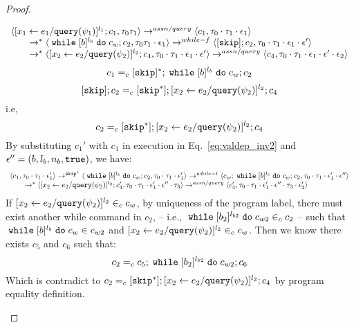 {\begin{proof}
\begin{subproof}
\[\begin{array}{l}
  \langle [\mathrel{ {x}_1 \leftarrow e_1 / {\tt query}(\psi_1) }]^{l_1} ; {c}_1, \mathtt{\tau}_0 \mathtt{\tau}_1 \rangle  
  \rightarrow^{assn/query}
  \langle c_1, \mathtt{\tau}_0 \cdot \mathtt{\tau}_1 \cdot \mathtt{\epsilon}_1 \rangle 
  \\
  \qquad \rightarrow^{*} 
  \langle \;\mathtt{while}\; [b]^{l_b} \;\mathtt{do}\; c_w;{c}_2, 
  \mathtt{\tau}_0 \mathtt{\tau}_1 \cdot \mathtt{\epsilon}_1 \rangle 
  \rightarrow^{while-f} 
  \langle [\mathtt{skip}]; c_2, \mathtt{\tau}_0 \cdot \mathtt{\tau}_1 \cdot \mathtt{\epsilon}_1 \cdot \mathtt{\epsilon}' \rangle 
  \\
  \qquad \rightarrow^{*} 
  \langle [\mathrel{ {x}_2 \leftarrow e_2 / {\tt query}(\psi_2) }]^{l_2};{c}_4, 
  \mathtt{\tau}_0 \cdot \mathtt{\tau}_1 \cdot \mathtt{\epsilon}_1 \cdot \mathtt{\epsilon}' \rangle 
  \rightarrow^{assn/query} 
  \langle {c}_4,  \mathtt{\tau}_0 \cdot \mathtt{\tau}_1 \cdot \mathtt{\epsilon}_1 \cdot \mathtt{\epsilon}' \cdot \mathtt{\epsilon}_2 \rangle 
  \end{array}
\]
%
\[
  c_1 =_c [\mathtt{skip}]{}^*; \;\mathtt{while}\; [b]^{l_b} \;\mathtt{do}\; c_w;{c}_2
\]
% 
\[
  [\mathtt{skip}]; c_2 =_c [\mathtt{skip}^*];[\mathrel{ {x}_2 \leftarrow e_2 / {\tt query}(\psi_2) }]^{l_2};{c}_4
\]
i.e,
\[
  c_2 =_c [\mathtt{skip}^*];[\mathrel{ {x}_2 \leftarrow e_2 / {\tt query}(\psi_2) }]^{l_2};{c}_4
\]
%
By substituting $c_1'$ with $c_1$ in execution in Eq.~\ref{eq:valdep_inv2} and $\mathtt{\epsilon}'' = (b, l_b, n_b, \mathtt{true})$, we have:
  \begin{equation}
  \label{eq:m1testwhile_inv2}
  \begin{array}{l}   
  \langle c_1, \mathtt{\tau}_0 \cdot \mathtt{\tau}_1 \cdot \mathtt{\epsilon}_1' \rangle 
  \rightarrow^{\mathtt{skip}^*} 
  \langle \;\mathtt{while}\; [b]^{l_b} \;\mathtt{do}\; c_w;{c}_2, \mathtt{\tau}_0 \cdot \mathtt{\tau}_1 \cdot \mathtt{\epsilon}_1' \rangle 
  \rightarrow^{while-t} 
  \langle c_w;\;\mathtt{while}\; [b]^{l_b} \;\mathtt{do}\; c_w;c_2, \mathtt{\tau}_0 \cdot \mathtt{\tau}_1 \cdot \mathtt{\epsilon}_1' \cdot \mathtt{\epsilon}'' \rangle 
  \\
  \qquad \rightarrow^{*} 
  \langle [\mathrel{ {x}_2 \leftarrow e_2 / {\tt query}(\psi_2) }]^{l_2};{c}_4', 
  \mathtt{\tau}_0 \cdot \mathtt{\tau}_1 \cdot \mathtt{\epsilon}_1' \cdot \mathtt{\epsilon}'' \cdot \mathtt{\tau}_3 \rangle
  \rightarrow^{assn/query} 
  \langle {c}_4',  \mathtt{\tau}_0 \cdot \mathtt{\tau}_1 \cdot \mathtt{\epsilon}_1' \cdot \mathtt{\epsilon}'' \cdot \mathtt{\tau}_3 \cdot \mathtt{\epsilon}_2' \rangle 
\end{array}
\end{equation}
%
If $[\mathrel{ {x}_2 \leftarrow e_2 / {\tt query}(\psi_2) }]^{l_2} \in_c c_w$, by uniqueness of the program label, there must exist another while command in $c_2$, -- i.e., $\;\mathtt{while}\; [b_2]^{l_{b2}} \;\mathtt{do}\; c_{w2} \in_c c_2$ --
    such that 
  $\;\mathtt{while}\; [b]^{l_b} \;\mathtt{do}\; c_w \in c_{w2}$ and $[\mathrel{ {x}_2 \leftarrow e_2 / {\tt query}(\psi_2) }]^{l_2} \in_c c_w$.
%
Then we know there exists $c_5$ and $c_6$ such that:
\[
  c_2 =_c c_5; \;\mathtt{while}\; [b_2]^{l_{b2}} \;\mathtt{do}\; c_{w2};c_6
\]
Which is contradict to $c_2 =_c [\mathtt{skip}^*];[\mathrel{ {x}_2 \leftarrow e_2 / {\tt query}(\psi_2) }]^{l_2};{c}_4$ by program equality definition.

\end{subproof}
\end{proof}}
